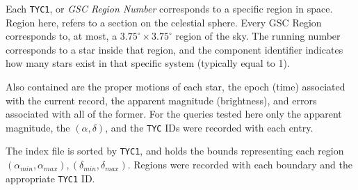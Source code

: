 Each \texttt{TYC1}, or \textit{GSC Region Number} corresponds to a specific region in space.
Region here, refers to a section on the celestial sphere.
Every GSC Region corresponds to, at most, a $3.75^\circ \times 3.75^\circ$ region of the sky.
The running number corresponds to a star inside that region, and the component identifier indicates how many stars
exist in that specific system (typically equal to 1).

Also contained are the proper motions of each star, the epoch (time) associated with the current record, the apparent
magnitude (brightness), and errors associated with all of the former.
For the queries tested here only the apparent magnitude, the $(\alpha, \delta)$, and the \texttt{TYC} IDs were recorded
with each entry.

The index file is sorted by \texttt{TYC1}, and holds the bounds representing each region $\left(\alpha_{min},
\alpha_{max}\right), \left(\delta_{min}, \delta_{max}\right)$.
Regions were recorded with each boundary and the appropriate \texttt{TYC1} ID\@.

